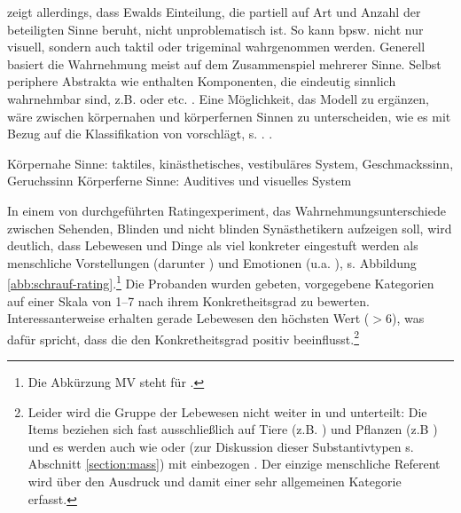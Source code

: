 \textcite{Schrauf2011} zeigt allerdings, dass Ewalds Einteilung, die partiell auf Art und Anzahl der beteiligten Sinne beruht, nicht unproblematisch ist. So kann  bpsw. nicht nur visuell, sondern auch taktil oder trigeminal wahrgenommen werden. Generell basiert die Wahrnehmung meist auf dem Zusammenspiel mehrerer Sinne. Selbst periphere Abstrakta  wie  enthalten Komponenten, die eindeutig sinnlich wahrnehmbar sind, z.B.  oder  etc. \parencite[vgl.][41]{Schrauf2011}. 
Eine Möglichkeit, das Modell zu ergänzen, wäre zwischen körpernahen und körperfernen Sinnen zu unterscheiden, wie es \textcite[42]{Schrauf2011} mit Bezug auf die Klassifikation von \textcite{Zimmer2007} vorschlägt, s. .  \parencite[42]{Schrauf2011}.\largerpage  

\begin{exe}
	\ex \label{sinne}
	\begin{xlist}
		\ex \label{nah} Körpernahe Sinne:  taktiles, kinästhetisches, vestibuläres System, Geschmackssinn, Geruchssinn
		\ex \label{fern} Körperferne Sinne: Auditives und visuelles System
	\end{xlist}
\end{exe}

In einem von \textcite[163--166]{Schrauf2011} durchgeführten Ratingexperiment, das Wahrnehmungsunterschiede zwischen Sehenden, Blinden und nicht blinden Synästhetikern aufzeigen soll, wird deutlich, dass Lebewesen und Dinge als viel konkreter eingestuft werden als menschliche Vorstellungen (darunter ) und Emotionen (u.a. ), s. Abbildung \ref{abb:schrauf-rating}.\footnote{Die Abkürzung MV steht für .} Die Probanden wurden gebeten, vorgegebene Kategorien auf einer Skala von 1--7 nach ihrem Konkretheitsgrad  zu bewerten. Interessanterweise erhalten gerade Lebewesen den höchsten Wert ($>6$), was dafür spricht, dass die  den Konkretheitsgrad  positiv beeinflusst.\footnote{Leider wird die Gruppe der Lebewesen nicht weiter in  und  unterteilt: Die Items beziehen sich fast ausschließlich auf Tiere (z.B. ) und Pflanzen (z.B ) und es werden auch  wie  oder  (zur Diskussion dieser  Substantivtypen s. Abschnitt \ref{section:mass}) mit einbezogen \parencite[143]{Schrauf2011}. Der einzige menschliche Referent wird über den Ausdruck  und damit einer sehr allgemeinen Kategorie erfasst.}

